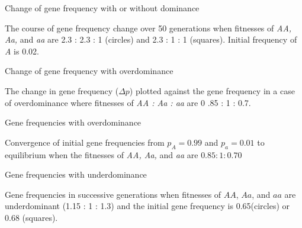 \documentclass[bluish,slideColor,colorBG,pdf]{prosper}
\begin{document}
\begin{slide}[Replace]{Change of gene frequency with or without dominance}

\centerline{}

\begin{center}
\parbox[t]{3.5in}{
The course of gene frequency change over 50 generations when fitnesses of
{\it AA, Aa,} and {\it aa} are 2.3 : 2.3 : 1 (circles) and 2.3 : 1 : 1
(squares).  Initial frequency
of {\it A} is 0.02.
}
\end{center}

\end{slide}

\begin{slide}[Replace]{Change of gene frequency with overdominance}

\centerline{}

\begin{center}
\parbox[t]{3.5in}{
The change in gene frequency ($\Delta p$) plotted against the gene
frequency in a case of overdominance where fitnesses of {\it AA : Aa : aa} are
0
.85 : 1 : 0.7.
}
\end{center}

\end{slide}

\begin{slide}[Replace]{Gene frequencies with overdominance}

\centerline{}

\begin{center}
\parbox[t]{3.5in}{
Convergence of initial gene frequencies from $p_A  =  0.99$ and
$p_a  =  0.01$ to equilibrium when the fitnesses of {\it AA, Aa,} and
{\it aa} are $0.85 : 1 : 0.70$
}
\end{center}

\end{slide}

\begin{slide}[Replace]{Gene frequencies with underdominance}

\centerline{}

\begin{center}
\parbox[t]{3.5in}{
Gene frequencies in successive generations when fitnesses of
$AA$, $Aa$, and $aa$ are underdominant (1.15 : 1 : 1.3) and the initial gene
frequency is 0.65(circles) or 0.68 (squares).
}
\end{center}

\end{slide}
\end{document}
